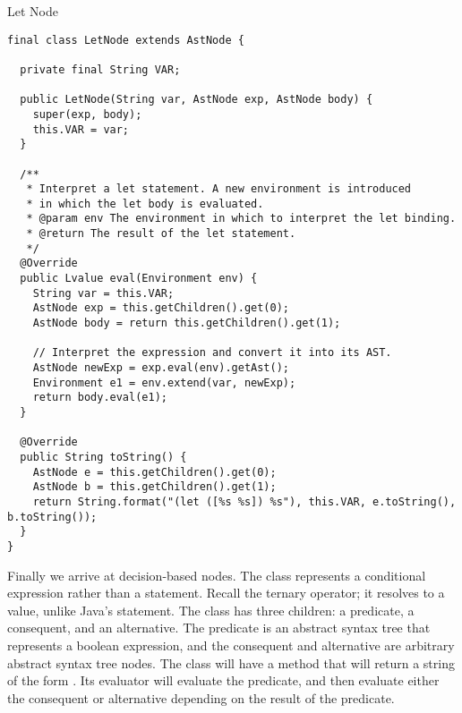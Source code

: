 \begin{cl}[]{Let Node}
\begin{lstlisting}[language=MyJava]
final class LetNode extends AstNode {

  private final String VAR;

  public LetNode(String var, AstNode exp, AstNode body) {
    super(exp, body);
    this.VAR = var;
  }

  /**
   * Interpret a let statement. A new environment is introduced 
   * in which the let body is evaluated.
   * @param env The environment in which to interpret the let binding.
   * @return The result of the let statement.
   */
  @Override
  public Lvalue eval(Environment env) {
    String var = this.VAR;
    AstNode exp = this.getChildren().get(0);
    AstNode body = return this.getChildren().get(1);

    // Interpret the expression and convert it into its AST.
    AstNode newExp = exp.eval(env).getAst();
    Environment e1 = env.extend(var, newExp);
    return body.eval(e1);
  }

  @Override
  public String toString() {
    AstNode e = this.getChildren().get(0);
    AstNode b = this.getChildren().get(1);
    return String.format("(let ([%s %s]) %s"), this.VAR, e.toString(), b.toString());
  }
}
\end{lstlisting}
\end{cl}

Finally we arrive at decision-based nodes. The  class represents a conditional expression rather than a statement. Recall the ternary operator; it resolves to a value, unlike Java's  statement. The  class has three children: a predicate, a consequent, and an alternative. The predicate is an abstract syntax tree that represents a boolean expression, and the consequent and alternative are arbitrary abstract syntax tree nodes. The  class will have a  method that will return a string of the form . Its evaluator will evaluate the predicate, and then evaluate either the consequent or alternative depending on the result of the predicate.

